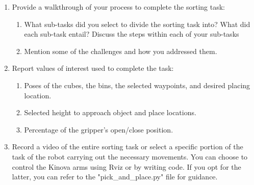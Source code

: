\documentclass[12pt]{article}
\begin{document}
\begin{enumerate}
    \item Provide a walkthrough of your process to complete the sorting task:
    \begin{enumerate}
        \item What sub-tasks did you select to divide the sorting task into? What did each sub-task entail?	Discuss the steps within each of your sub-tasks
        
        \item Mention some of the challenges and how you addressed them.
    \end{enumerate}
    \item Report values of interest used to complete the task:
    \begin{enumerate}
        \item Poses of the cubes, the bins, the selected waypoints, and desired placing location.
        \item Selected height to approach object and place locations.
        \item Percentage of the gripper’s open/close position.
        
    \end{enumerate}
    
    \item Record a video of the entire sorting task or select a specific portion of the task of the robot carrying out the necessary movements. You can choose to control the Kinova arms using Rviz or by writing code. If you opt for the latter, you can refer to the "pick\_and\_place.py" file for guidance.
\end{enumerate}
\end{document}
